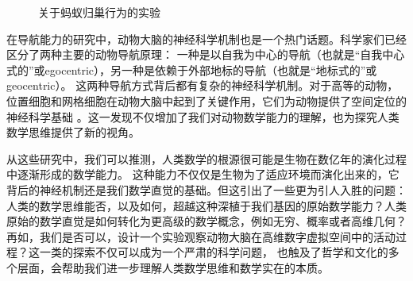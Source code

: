 \begin{figure}[ht]\centering
{}
\caption{关于蚂蚁归巢行为的实验}\label{fig:ant-navi}
\end{figure}

在导航能力的研究中，动物大脑的神经科学机制也是一个热门话题。科学家们已经区分了两种主要的动物导航原理：
一种是以自我为中心的导航（也就是“自我中心式的”或egocentric），另一种是依赖于外部地标的导航（也就是“地标式的”或geocentric）。
这两种导航方式背后都有复杂的神经科学机制。对于高等的动物，位置细胞和网格细胞在动物大脑中起到了关键作用，它们为动物提供了空间定位的神经科学基础
\cite{Moser2008PlaceCG}。这一发现不仅增加了我们对动物数学能力的理解，也为探究人类数学思维提供了新的视角。

从这些研究中，我们可以推测，人类数学的根源很可能是生物在数亿年的演化过程中逐渐形成的数学能力。
这种能力不仅仅是生物为了适应环境而演化出来的，它背后的神经机制还是我们数学直觉的基础。但这引出了一些更为引人入胜的问题：
人类的数学思维能否，以及如何，超越这种深植于我们基因的原始数学能力？人类原始的数学直觉是如何转化为更高级的数学概念，例如无穷、概率或者高维几何？
再如，我们是否可以，设计一个实验观察动物大脑在高维数字虚拟空间中的活动过程？这一类的探索不仅可以成为一个严肃的科学问题，
也触及了哲学和文化的多个层面，会帮助我们进一步理解人类数学思维和数学实在的本质。



